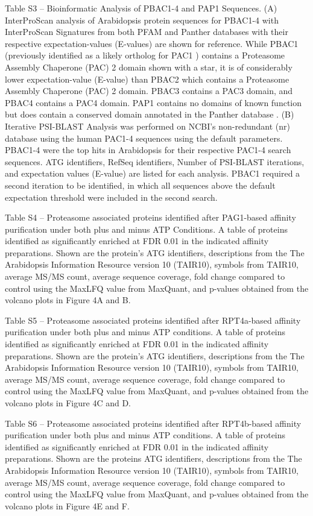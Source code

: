 Table S3 – Bioinformatic Analysis of PBAC1-4 and PAP1 Sequences. (A) InterProScan \citep{jones14} analysis of Arabidopsis protein sequences for PBAC1-4 with InterProScan Signatures from both PFAM and Panther databases with their respective expectation-values (E-values) are shown for reference. While PBAC1 (previously identified as a likely ortholog for PAC1 \citep{kusmierczyk11}) contains a Proteasome Assembly Chaperone (PAC) 2 domain shown with a star, it is of considerably lower expectation-value (E-value) than PBAC2 which contains a Proteasome Assembly Chaperone (PAC) 2 domain. PBAC3 contains a PAC3 domain, and PBAC4 contains a PAC4 domain. PAP1 contains no domains of known function but does contain a conserved domain annotated in the Panther database \citep{mi05}. (B) Iterative PSI-BLAST Analysis was performed on NCBI’s non-redundant (nr) database using the human PAC1-4 sequences using the default parameters. PBAC1-4 were the top hits in Arabidopsis for their respective PAC1-4 search sequences. ATG identifiers, RefSeq identifiers, Number of PSI-BLAST iterations, and expectation values (E-value) are listed for each analysis. PBAC1 required a second iteration to be identified, in which all sequences above the default expectation threshold were included in the second search.

Table S4 – Proteasome associated proteins identified after PAG1-based affinity purification under both plus and minus ATP Conditions. A table of proteins identified as significantly enriched at FDR 0.01 in the indicated affinity preparations.  Shown are the protein’s ATG identifiers, descriptions from the The Arabidopsis Information Resource version 10 (TAIR10), symbols from TAIR10, average MS/MS count, average sequence coverage, fold change compared to control using the MaxLFQ value from MaxQuant, and p-values obtained from the volcano plots in Figure 4A and B.

Table S5 – Proteasome associated proteins identified after RPT4a-based affinity purification under both plus and minus ATP conditions. A table of proteins identified as significantly enriched at FDR 0.01 in the indicated affinity preparations.  Shown are the protein’s ATG identifiers, descriptions from the The Arabidopsis Information Resource version 10 (TAIR10), symbols from TAIR10, average MS/MS count, average sequence coverage, fold change compared to control using the MaxLFQ value from MaxQuant, and p-values obtained from the volcano plots in Figure 4C and D.

Table S6 – Proteasome associated proteins identified after RPT4b-based affinity purification under both plus and minus ATP conditions. A table of proteins identified as significantly enriched at FDR 0.01 in the indicated affinity preparations.  Shown are the proteins ATG identifiers, descriptions from the The Arabidopsis Information Resource version 10 (TAIR10), symbols from TAIR10, average MS/MS count, average sequence coverage, fold change compared to control using the MaxLFQ value from MaxQuant, and p-values obtained from the volcano plots in Figure 4E and F.


